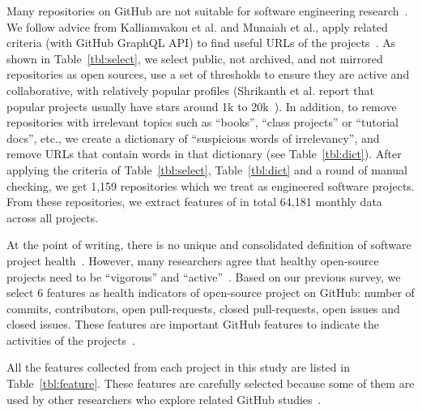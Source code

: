 \documentclass[smallextended]{svjour3}
\newcommand{\respto}[1]{
\fcolorbox{black}{black!15}{%
\label{resp:#1}%
\bf\scriptsize R{#1}}}
\newcommand{\BLUE}{\color{blue}}
\newcommand{\BLACK}{\color{black}}
\begin{document}
\BLUE
\respto{4G1}
Many repositories on GitHub are not suitable for software engineering research~\cite{kalliamvakou2016depth,munaiah2017curating}. We follow advice from Kalliamvakou et al. and Munaiah et al., apply related criteria (with GitHub GraphQL API) to find useful URLs of the projects~\cite{munaiah2017curating,kalliamvakou2014promises}.
As shown in Table~\ref{tbl:select}, we select public, not archived, and not mirrored repositories as open sources, use a set of thresholds to ensure they are active and collaborative, with relatively popular profiles (Shrikanth et al. report that popular projects usually have stars around 1k to 20k~\cite{shrikanth2021early}).
\BLACK
In addition, to remove repositories with irrelevant topics such as ``books'', ``class projects'' or ``tutorial docs'', etc., we create a dictionary of ``suspicious words of irrelevancy'', and remove URLs that contain words in that dictionary (see  Table~\ref{tbl:dict}). After applying the criteria of Table~\ref{tbl:select}, Table~\ref{tbl:dict} and a round of manual checking, 
we get 1,159 repositories which we treat as engineered software projects. From these repositories, we extract features of in total 64,181 monthly data across all projects.
\BLACK

At the point of writing, there is no unique and consolidated definition of software project health~\cite{jansen2014measuring,liao2019healthy,link2018assessing}. However, many researchers agree that healthy open-source projects need to be ``vigorous'' and ``active''~\cite{wahyudin2007monitoring,jansen2014measuring,manikas2013reviewing,link2018assessing,wynn2007assessing,crowston2006assessing}. 
Based on our previous survey, we select 6 features as health indicators of open-source project on GitHub: number of commits, contributors, open pull-requests, closed pull-requests, open issues and closed issues. These features are important GitHub features to indicate the activities of the projects~\cite{borges2016understanding,han2019characterization,aggarwal2014co}.

All the features collected from each project in this study 
are listed in Table~\ref{tbl:feature}. These features are carefully selected because some of them are used by other researchers who explore related
GitHub studies~\cite{coelho2020github, yu2016reviewer, han2019characterization}.  
\end{document}
